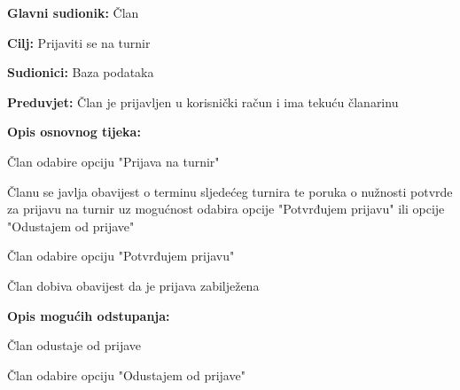 		\noindent {}
		\begin{packed_item}
			
			\item \textbf{Glavni sudionik: } Član
			\item  \textbf{Cilj: } Prijaviti se na turnir
			\item  \textbf{Sudionici: } Baza podataka
			\item  \textbf{Preduvjet: } Član je prijavljen u korisnički račun i ima tekuću članarinu
			\item  \textbf{Opis osnovnog tijeka:}
			
			\item[] \begin{packed_enum}
				
				\item Član odabire opciju "Prijava na turnir"
				\item Članu se javlja obavijest o terminu sljedećeg turnira te poruka o nužnosti potvrde za prijavu na turnir uz mogućnost odabira opcije "Potvrđujem prijavu" ili opcije "Odustajem od prijave"
				\item Član odabire opciju "Potvrđujem prijavu"
				\item Član dobiva obavijest da je prijava zabilježena
				
			\end{packed_enum}
			
			\item  \textbf{Opis mogućih odstupanja:}
			
			\item[] \begin{packed_item}
				
				\item[2.a] Član odustaje od prijave
				\item[] \begin{packed_enum}
					
					\item Član odabire opciju "Odustajem od prijave"
					
				\end{packed_enum}
				
			\end{packed_item}
		\end{packed_item}
		
		\eject
		
